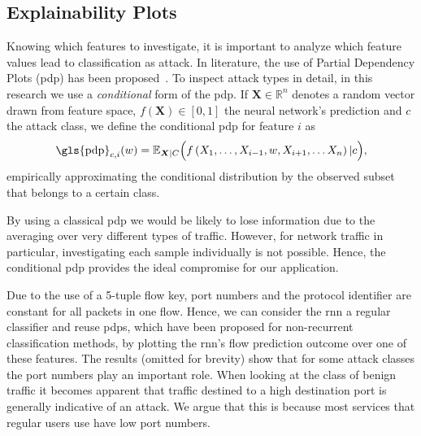 \documentclass[conference]{IEEEtran}
\begin{document}
\subsection{Explainability Plots}
Knowing which features to investigate, it is important to analyze which feature values lead to classification as attack.
In literature, the use of Partial Dependency Plots (\gls{pdp}) has been proposed~\cite{friedman_greedy_2001}. To inspect attack types in detail, in this research we use a \textit{conditional} form of the \gls{pdp}. If $\boldsymbol X \in \mathbb R ^n$ denotes a random vector drawn from feature space, $f(\boldsymbol X) \in [0,1]$ the neural network's prediction and $c$ the attack class, we define the conditional \gls{pdp} for feature $i$  as
\begin{equation} \label{eq:pdp_conditional}
\text{\gls{pdp}}_{c,i}(w) = \mathbb E_{\boldsymbol X | C} \Big(f \left( X_1,\ldots,X_{i-1},w,X_{i+1},\ldots X_n \right) | c\Big),
\end{equation}
empirically approximating the conditional distribution by the observed subset that belongs to a certain class.

By using a classical \gls{pdp} we would be likely to lose information due to the averaging over very different types of traffic. However, for network traffic in particular, investigating each sample individually is not possible. Hence, the conditional \gls{pdp} provides the ideal compromise for our application.

Due to the use of a 5-tuple flow key, port numbers and the protocol identifier are constant for all packets in one flow.
Hence, we can consider the \gls{rnn} a regular classifier and reuse 
\glspl{pdp}, which have been proposed for non-recurrent classification methods, by plotting the \gls{rnn}'s flow prediction outcome over one of these  features.
The results (omitted for brevity) show that for some attack classes the port numbers play an important role. When looking at the class of benign traffic %
it becomes apparent that traffic destined to a high destination port is generally indicative of an attack. We argue that this is because most services that regular users use have low port numbers.
\end{document}
